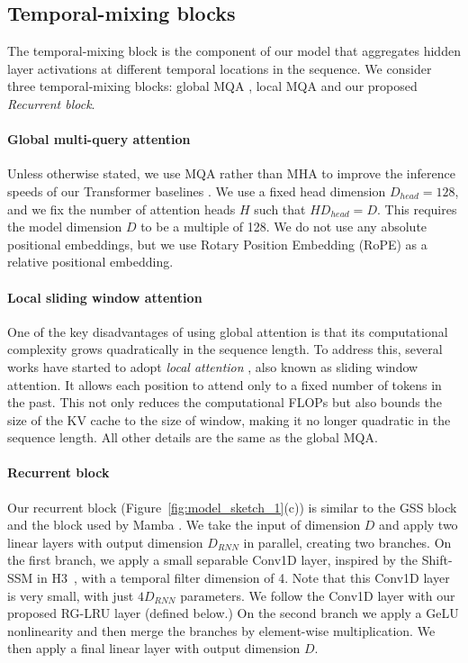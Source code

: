\subsection{Temporal-mixing {blocks}}

The temporal-mixing {block} is the component of our model that aggregates hidden layer activations at different temporal locations in the sequence. We consider three temporal-mixing {blocks}: global MQA \citep{shazeer2019fast}, local MQA \citep{beltagy2020longformer} and our proposed \emph{Recurrent {block}}.

\paragraph{Global multi-query attention}

Unless otherwise stated, we use MQA rather than MHA to improve the inference speeds of our Transformer baselines \citep{shazeer2019fast}. We use a fixed head dimension $D_{head} = 128$, and we fix the number of attention heads $H$ such that $HD_{head} = D$. This requires the model dimension $D$ to be a multiple of 128. We do not use any absolute positional embeddings, but we use Rotary Position Embedding (RoPE) \citep{su2021roformer} as a relative positional embedding. 

\paragraph{Local sliding window attention}
\label{sec:local_attention}

One of the key disadvantages of using global attention is that its computational complexity grows quadratically in the sequence length. To address this, several works have started to adopt \emph{local attention} \citep{beltagy2020longformer}, also known as sliding window attention. It allows each position to attend only to a fixed number of tokens in the past. This not only reduces the computational FLOPs but also bounds the size of the KV cache to the size of window, making it no longer quadratic in the sequence length. All other details are the same as the global MQA.

\paragraph{Recurrent {block}}
\label{sec:recurrent_block}
Our recurrent {block}  (Figure~\ref{fig:model_sketch_1}(c))  is similar to the GSS block \citep{mehta2022long} and the block used by Mamba \citep{gu2023mamba}. We take the input of dimension $D$ and apply two linear layers with output dimension $D_{RNN}$ in parallel, creating two branches. On the first branch, we apply a small separable Conv1D layer, inspired by the Shift-SSM in H3~\citep{dao2022hungry}, with a temporal filter dimension of 4. Note that this Conv1D layer is very small, with just $4D_{RNN}$ parameters. We follow the Conv1D layer with our proposed RG-LRU layer (defined below.) On the second branch we apply a GeLU nonlinearity and then merge the branches by element-wise multiplication. We then apply a final linear layer with output dimension $D$. 

